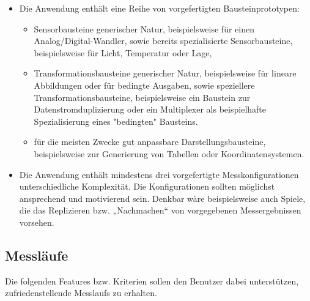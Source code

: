 \documentclass[parskip=full]{scrartcl}
\begin{document}
\begin{itemize}
	
	\item Die Anwendung enthält eine Reihe von vorgefertigten Bausteinprototypen: 
	\begin{itemize}
		
		\item 
		\begin{MussKrit} 		
			Sensorbausteine generischer Natur, beispielsweise für einen Analog/Digital-Wandler, sowie bereits spezialisierte Sensorbausteine, beispielsweise für Licht, Temperatur oder Lage,	
		\end{MussKrit} 
		
		\item 
		\begin{MussKrit} 		
			Transformationsbausteine generischer Natur, beispielsweise für lineare Abbildungen oder für bedingte Ausgaben, sowie speziellere Transformationsbausteine, beispielsweise ein Baustein zur Datenstromduplizierung oder ein Multiplexer als beispielhafte Spezialisierung eines "bedingten" Bausteins. 
				
		\end{MussKrit}
		
		\item 
		\begin{MussKrit} 	
			für die meisten Zwecke gut anpassbare Darstellungsbausteine, beispielsweise zur Generierung von Tabellen oder Koordinatensystemen.					
		\end{MussKrit}
	\end{itemize}
	
	\item 
	\begin{MussKrit} 
		Die Anwendung enthält mindestens drei vorgefertigte Messkonfigurationen unterschiedliche Komplexität. Die Konfigurationen sollten möglichst ansprechend und motivierend sein. Denkbar wäre beispielsweise auch Spiele, die das Replizieren bzw. „Nachmachen“ von vorgegebenen Messergebnissen vorsehen.			
	\end{MussKrit}
	
\end{itemize}


\subsection{Messläufe}

Die folgenden Features bzw. Kriterien sollen den Benutzer dabei unterstützen, zufriedenstellende \glspl{Messlauf} zu erhalten.
\end{document}

